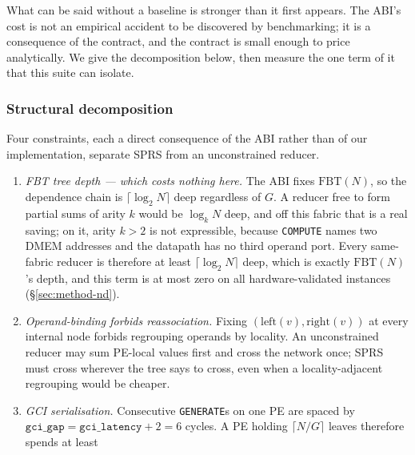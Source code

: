 \documentclass[journal,10pt]{IEEEtran}
\theoremstyle{plain}
\theoremstyle{definition}
\theoremstyle{remark}
\newcommand{\FBT}{\ensuremath{\mathrm{FBT}}}
\newcommand{\sprs}{\textsc{SPRS}}
\newcommand{\sv}[1]{\texttt{#1}}
\begin{document}
What can be said without a baseline is stronger than it first appears. The
ABI's cost is not an empirical accident to be discovered by benchmarking; it
is a consequence of the contract, and the contract is small enough to price
analytically. We give the decomposition below, then measure the one term of
it that this suite can isolate.

\subsubsection{Structural decomposition}

Four constraints, each a direct consequence of the ABI rather than of our
implementation, separate \sprs{} from an unconstrained reducer.

\begin{enumerate}
\item \emph{FBT tree depth --- which costs nothing here.} The ABI fixes
  $\FBT(N)$, so the dependence chain is $\lceil\log_2 N\rceil$ deep
  regardless of $G$. A reducer free to form partial sums of arity $k$ would be
  $\log_k N$ deep, and off this fabric that is a real saving; on it, arity
  $k > 2$ is not expressible, because \texttt{COMPUTE} names two DMEM
  addresses and the datapath has no third operand port. Every same-fabric
  reducer is therefore at least $\lceil\log_2 N\rceil$ deep, which is
  exactly $\FBT(N)$'s depth, and this term is at most zero on all
  \TournNInst{} hardware-validated instances (\S\ref{sec:method-nd}).
\item \emph{Operand-binding forbids reassociation.} Fixing
  $(\mathrm{left}(v),\mathrm{right}(v))$ at every internal node forbids
  regrouping operands by locality. An unconstrained reducer may sum
  PE-local values first and cross the network once; \sprs{} must cross
  wherever the tree says to cross, even when a locality-adjacent regrouping
  would be cheaper.
\item \emph{GCI serialisation.} Consecutive \texttt{GENERATE}s on one PE are
  spaced by $\sv{gci\_gap} = \sv{gci\_latency} + 2 = 6$ cycles. A PE holding
  $\lceil N/G \rceil$ leaves therefore spends at least

\end{enumerate}
\end{document}
